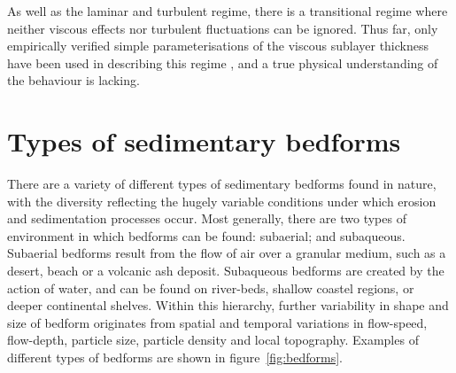\documentclass[12pt]{article}
\begin{document}
As well as the laminar and turbulent regime, there is a transitional regime where neither viscous effects nor turbulent fluctuations can be ignored. Thus far, only empirically verified simple parameterisations of the viscous sublayer thickness have been used in describing this regime \citep{Abrams85, Frederick88}, and a true physical understanding of the behaviour is lacking.
\section{Types of sedimentary bedforms}
\label{sec:sed_bed}

There are a variety of different types of sedimentary bedforms found in nature, with the diversity reflecting the hugely variable conditions under which erosion and sedimentation processes occur. Most generally, there are two types of environment in which bedforms can be found: subaerial; and subaqueous. Subaerial bedforms result from the flow of air over a granular medium, such as a desert, beach or a volcanic ash deposit. Subaqueous bedforms are created by the action of water, and can be found on river-beds, shallow coastel regions, or deeper continental shelves. Within this hierarchy, further variability in shape and size of bedform originates from spatial and temporal variations in flow-speed, flow-depth, particle size, particle density and local topography. Examples of different types of bedforms are shown in figure~\ref{fig:bedforms}.
\end{document}
